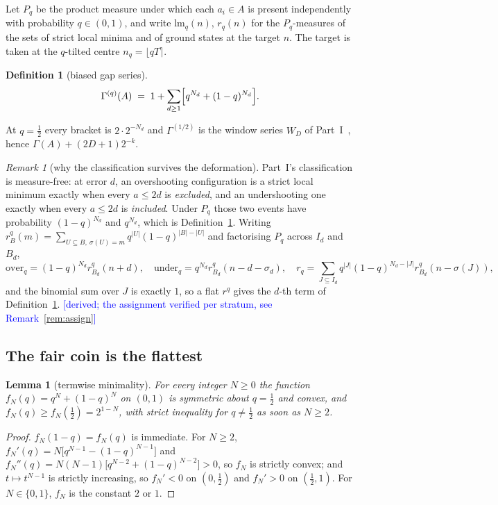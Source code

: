 \documentclass[11pt,a4paper]{article}
\theoremstyle{plain}
\newtheorem{lemma}[theorem]{Lemma}
\theoremstyle{definition}
\newtheorem{definition}[theorem]{Definition}
\theoremstyle{remark}
\newtheorem{remark}[theorem]{Remark}
\newcommand{\lm}{\mathrm{lm}}
\newcommand{\STATUS}[1]{\textcolor{blue}{\textsf{[#1]}}}
\begin{document}
Let $P_q$ be the product measure under which each $a_i\in A$ is present independently with
probability $q\in(0,1)$, and write $\lm_q(n)$, $r_q(n)$ for the $P_q$-measures of the sets
of strict local minima and of ground states at the target $n$. The target is taken at the
$q$-tilted centre $n_q=\lfloor qT\rceil$.

\begin{definition}[biased gap series]\label{def:gq}
\[
  \Gamma^{(q)}(A)\;=\;1+\sum_{d\ge1}\Bigl[q^{N_d}+(1-q)^{N_d}\Bigr].
\]
\end{definition}

At $q=\tfrac12$ every bracket is $2\cdot2^{-N_d}$ and $\Gamma^{(1/2)}$ is the window series
$W_D$ of Part~I~\cite{P1}, hence $\Gamma(A)+(2D+1)2^{-k}$.

\begin{remark}[why the classification survives the deformation]\label{rem:measurefree}
Part~I's classification is measure-free: at error $d$, an overshooting configuration is a
strict local minimum exactly when every $a\le2d$ is \emph{excluded}, and an undershooting one
exactly when every $a\le2d$ is \emph{included}. Under $P_q$ those two events have probability
$(1-q)^{N_d}$ and $q^{N_d}$, which is Definition~\ref{def:gq}. Writing
$r^{q}_B(m)=\sum_{U\subseteq B,\ \sigma(U)=m}q^{|U|}(1-q)^{|B|-|U|}$ and factorising $P_q$
across $I_d$ and $B_d$,
\[
  \mathrm{over}_q=(1-q)^{N_d}r^{q}_{B_d}(n+d),\quad
  \mathrm{under}_q=q^{N_d}r^{q}_{B_d}(n-d-\sigma_d),\quad
  r_q=\!\!\sum_{J\subseteq I_d}\!\!q^{|J|}(1-q)^{N_d-|J|}r^{q}_{B_d}(n-\sigma(J)),
\]
and the binomial sum over $J$ is exactly $1$, so a flat $r^{q}$ gives the $d$-th term of
Definition~\ref{def:gq}. \STATUS{derived; the assignment verified per stratum, see
Remark~\ref{rem:assign}}
\end{remark}

\subsection{The fair coin is the flattest}

\begin{lemma}[termwise minimality]\label{lem:termwise}
For every integer $N\ge0$ the function $f_N(q)=q^{N}+(1-q)^{N}$ on $(0,1)$ is symmetric about
$q=\tfrac12$ and convex, and $f_N(q)\ge f_N(\tfrac12)=2^{1-N}$, with strict inequality for
$q\ne\tfrac12$ as soon as $N\ge2$.
\end{lemma}

\begin{proof}
$f_N(1-q)=f_N(q)$ is immediate. For $N\ge2$,
$f_N'(q)=N\bigl[q^{N-1}-(1-q)^{N-1}\bigr]$ and
$f_N''(q)=N(N-1)\bigl[q^{N-2}+(1-q)^{N-2}\bigr]>0$, so $f_N$ is strictly convex; and
$t\mapsto t^{N-1}$ is strictly increasing, so $f_N'<0$ on $(0,\tfrac12)$ and $f_N'>0$ on
$(\tfrac12,1)$. For $N\in\{0,1\}$, $f_N$ is the constant $2$ or $1$.
\end{proof}
\end{document}
